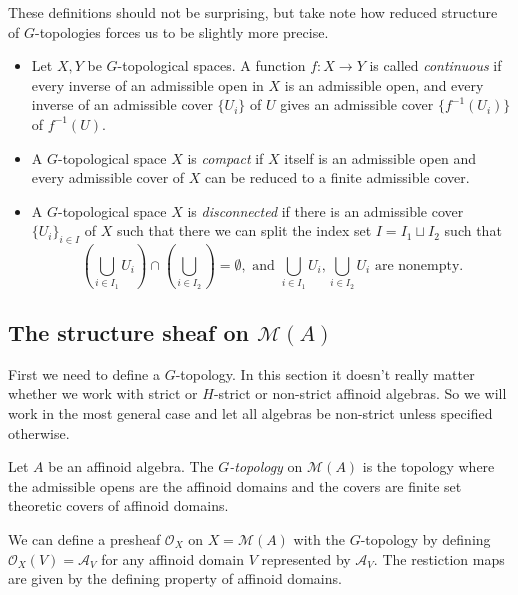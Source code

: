 \begin{definition}
	These definitions should not be surprising, but take note how reduced structure of $G$-topologies forces us to be slightly more precise.  
	\begin{itemize}
		\item  Let $X, Y$ be $G$-topological spaces. 
			A function $f: X \to Y$ is called \emph{continuous} if every inverse of an admissible open in $X$ is an admissible open, and every inverse of an admissible cover $\{U_i\} $ of $U$ gives an admissible cover $\{f^{-1}(U_i)\} $ of $f^{-1}(U)$. 
		\item A $G$-topological space $X$ is \emph{compact} if $X$ itself is an admissible open and every admissible cover of $X$ can be reduced to a finite admissible cover. 
		\item A $G$-topological space $X$ is \emph{disconnected} if there is an admissible cover $\{U_i\} _{i \in I}$ of $X$ such that there we can split the index set $I = I_1 \sqcup I_2$  such that \[
				\left(\bigcup_{i \in  I_1} U_i\right)\cap \left( \bigcup_{i \in I_2}  \right)  = \emptyset, \text{ and } \bigcup_{i \in I_1} U_i, \bigcup_{i \in I_2} U_i \text{ are nonempty}
		.\] 
	\end{itemize}
\end{definition}



\subsection{The structure sheaf on $\mathcal{M} (A)$} \label{sec:the_structure_sheaf_on_ma}

First we need to define a $G$-topology. In this section it doesn't really matter whether we work with strict or $H$-strict or non-strict affinoid algebras. So we will work in the most general case and let all algebras be non-strict unless specified otherwise.  

\begin{definition}
	Let $A$ be an affinoid algebra. 
	The \emph{$G$-topology} on $\mathcal{M} (A)$ is the topology where the admissible opens are the affinoid domains and the covers are finite set theoretic covers of affinoid domains. 
\end{definition}

We can define a presheaf $\mathcal{O}_X$ on $X =\mathcal{M} (A)$ with the $G$-topology by defining $\mathcal{O}_X(V) = \mathcal{A} _V$ for any affinoid domain $V$ represented by $\mathcal{A}_V$.
The restiction maps are given by the defining property of affinoid domains.

